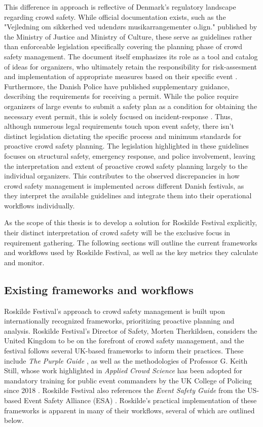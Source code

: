 This difference in approach is reflective of Denmark's regulatory landscape regarding crowd safety. While official documentation exists, such as the "Vejledning om sikkerhed ved udendørs musikarrangementer o.lign." published by the Ministry of Justice and Ministry of Culture, these serve as guidelines rather than enforceable legislation specifically covering the planning phase of crowd safety management. The document itself emphasizes its role as a tool and catalog of ideas for organizers, who ultimately retain the responsibility for risk-assesment and implementation of appropriate measures based on their specific event \cite{jm_safety}. Furthermore, the Danish Police have published supplementary guidance, describing the requirements for receiving a permit. While the police require organizers of large events to submit a safety plan as a condition for obtaining the necessary event permit, this is solely focused on incident-response \cite{police_safety}. Thus, although numerous legal requirements touch upon event safety, there isn't distinct legislation dictating the specific process and minimum standards for proactive crowd safety planning. The legislation highlighted in these guidelines focuses on structural safety, emergency response, and police involvement, leaving the interpretation and extent of proactive crowd safety planning largely to the individual organizers. This contributes to the observed discrepancies in how crowd safety management is implemented across different Danish festivals, as they interpret the available guidelines and integrate them into their operational workflows individually.

As the scope of this thesis is to develop a solution for Roskilde Festival explicitly, their distinct interpretation of crowd safety will be the exclusive focus in requirement gathering. The following sections will outline the current frameworks and workflows used by Roskilde Festival, as well as the key metrics they calculate and monitor.


\subsection{Existing frameworks and workflows}
\label{sec:existing-frameworks}

Roskilde Festival's approach to crowd safety management is built upon internationally recognized frameworks, prioritizing proactive planning and analysis. Roskilde Festival's Director of Safety, Morten Therkildsen, considers the United Kingdom to be on the forefront of crowd safety management, and the festival follows several UK-based frameworks to inform their practices. These include \textit{The Purple Guide} \cite{purple_guide}, as well as the methodologies of Professor G. Keith Still, whose work highlighted in \textit{Applied Crowd Science} has been adopted for mandatory training for public event commanders by the UK College of Policing since 2018 \cite{keith_still}. Roskilde Festival also references the \textit{Event Safety Guide} from the US-based Event Safety Alliance (ESA) \cite{es_guide}. Roskilde's practical implementation of these frameworks is apparent in many of their workflows, several of which are outlined below.

